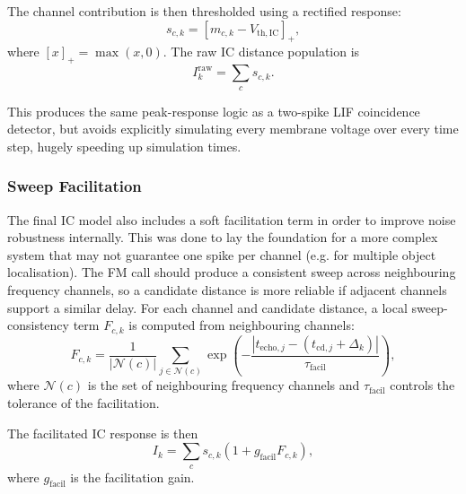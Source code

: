 The channel contribution is then thresholded using a rectified response:
\begin{equation}
    s_{c,k}
    =
    \left[
        m_{c,k}
        -
        V_{\mathrm{th,IC}}
    \right]_+,
\end{equation}
where $[x]_+=\max(x,0)$. The raw IC distance population is
\begin{equation}
    I_k^{\mathrm{raw}}
    =
    \sum_c s_{c,k}.
\end{equation}

This produces the same peak-response logic as a two-spike LIF coincidence detector, but avoids explicitly simulating every membrane voltage over every time step, hugely speeding up simulation times.

\subsubsection{Sweep Facilitation}

The final IC model also includes a soft facilitation term in order to improve noise robustness internally. This was done to lay the foundation for a more complex system that may not guarantee one spike per channel (e.g. for multiple object localisation). The FM call should produce a consistent sweep across neighbouring frequency channels, so a candidate distance is more reliable if adjacent channels support a similar delay. For each channel and candidate distance, a local sweep-consistency term $F_{c,k}$ is computed from neighbouring channels:
\begin{equation}
    F_{c,k}
    =
    \frac{1}{|\mathcal{N}(c)|}
    \sum_{j \in \mathcal{N}(c)}
    \exp
    \left(
        -
        \frac{
            \left|
                t_{\mathrm{echo},j}
                -
                \left(
                    t_{\mathrm{cd},j}
                    +
                    \Delta_k
                \right)
            \right|
        }{
            \tau_{\mathrm{facil}}
        }
    \right),
\end{equation}
where $\mathcal{N}(c)$ is the set of neighbouring frequency channels and $\tau_{\mathrm{facil}}$ controls the tolerance of the facilitation.

The facilitated IC response is then
\begin{equation}
    I_k
    =
    \sum_c
    s_{c,k}
    \left(
        1
        +
        g_{\mathrm{facil}}F_{c,k}
    \right),
\end{equation}
where $g_{\mathrm{facil}}$ is the facilitation gain.

